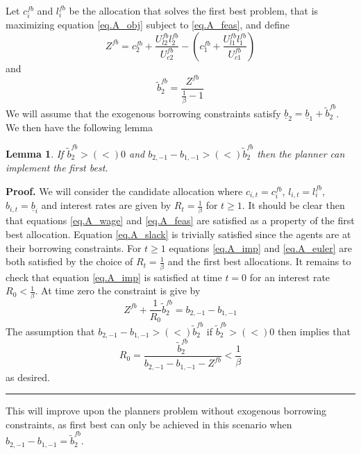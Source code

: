 \documentclass[thmsb,11pt]{article}
\newtheorem{lemma}{Lemma}
\newenvironment{proof}[1][Proof]{\noindent \textbf{#1.} }{\  \rule{0.5em}{0.5em}}
\begin{document}
Let $c^{fb}_i$ and $l^{fb}_i$ be the allocation that solves the first best problem, that is maximizing equation \eqref{eq.A_obj} subject to \eqref{eq.A_feas}, and define
\begin{equation}
	Z^{fb}  = c_{2}^{fb}+\frac{U_{l2}^{fb}l_{2}^{fb}}{U_{c2}^{fb}}-\left(c_{1}^{fb}+\frac{U_{l1}^{fb}l_{1}^{fb}}{U_{c1}^{fb}}\right)
\end{equation}and
\begin{equation}
	\tilde b_2^{fb} = \frac{Z^{fb}}{\frac1\beta -1}
\end{equation}  We will assume that the exogenous borrowing constraints satisfy $\underline b_2 = \underline b_1 + \tilde b_2^{fb}$.  We then have the following lemma

\begin{lemma}  If $\tilde b_2^{fb}>(<)0$ and $b_{2,-1}-b_{1,-1} > (<) \tilde b_2^{fb}$ then the planner can implement the first best.
\end{lemma}
\begin{proof}
We will consider the candidate allocation where $c_{i,t} = c^{fb}_i$, $l_{i,t} = l^{fb}_i$, $b_{i,t} = \underline b_i$ and interest rates are given by $R_t = \frac 1{\beta}$ for $t\geq 1$.  It should be clear then that equations \eqref{eq.A_wage} and \eqref{eq.A_feas} are satisfied as a property of the first best allocation.  Equation \eqref{eq.A_slack} is trivially satisfied since the agents are at their borrowing constraints.  For $t\geq 1$ equations \eqref{eq.A_imp} and \eqref{eq.A_euler} are both satisfied by the choice of $R_t = \frac1\beta$ and the first best allocations.  It remains to check that equation \eqref{eq.A_imp} is satisfied at time $t=0$ for an interest rate $R_0 <\frac1\beta$.  At time zero the constraint is give by
\begin{equation}
	Z^{fb} + \frac 1{R_0} \tilde b^{fb}_2 = b_{2,-1}-b_{1,-1}
\end{equation}  The assumption that $b_{2,-1}-b_{1,-1} > (<) \tilde b_2^{fb}$ if  $\tilde b_2^{fb}>(<)0$ then implies that
\[
	R_ 0 = \frac{\tilde b^{fb}_2}{b_{2,-1}-b_{1,-1}- Z^{fb}} <\frac 1\beta
\] as desired.
\end{proof}

This will improve upon the planners problem without exogenous borrowing constraints, as first best can only be achieved in this scenario when $b_{2,-1}-b_{1,-1} = \tilde b_2^{fb}$.


\newpage
\end{document}
